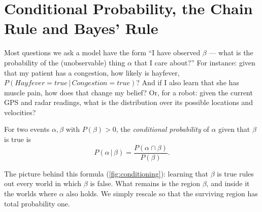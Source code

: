 \documentclass[11pt, oneside]{book}
\newcommand{\Prob}{\mathbb{P}}           %
\newcommand{\given}{\,\vert\,}           %
\newcommand{\vn}[1]{\mathit{#1}}         %
\let\originalsection\section
\renewcommand{\section}{\Needspace{7\baselineskip}\originalsection}
\begin{document}
\section{Conditional Probability, the Chain Rule and Bayes' Rule}

Most questions we ask a model have the form ``I have observed $\beta$ --- what
is the probability of the (unobservable) thing $\alpha$ that I care about?''
For instance: given that my patient has a congestion, how likely is hayfever,
$P(\vn{Hayfever} = \vn{true} \given \vn{Congestion} = \vn{true})$? And if I
also learn that she has muscle pain, how does that change my belief? Or, for a
robot: given the current GPS and radar readings, what is the distribution over
its possible locations and velocities?

\begin{defbox}[title={Conditional probability}, unbreakable]
For two events $\alpha, \beta$ with $P(\beta) > 0$, the \emph{conditional
probability} of $\alpha$ given that $\beta$ is true is
\[
  P(\alpha \given \beta) = \frac{P(\alpha \cap \beta)}{P(\beta)} .
\]
\end{defbox}

The picture behind this formula (\cref{fig:conditioning}): learning that
$\beta$ is true rules out every world in which $\beta$ is false. What remains
is the region $\beta$, and inside it the worlds where $\alpha$ also holds. We
simply rescale so that the surviving region has total probability one.
\end{document}
